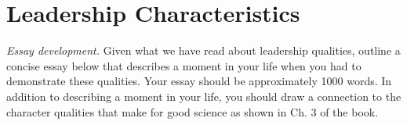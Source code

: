 \documentclass{article}
\begin{document}
\section{Leadership Characteristics}

\textit{Essay development.}  Given what we have read about leadership qualities, outline a concise essay below that describes a moment in your life when you had to demonstrate these qualities.  Your essay should be approximately 1000 words.  In addition to describing a moment in your life, you should draw a connection to the character qualities that make for good science as shown in Ch. 3 of the book.
\end{document}
